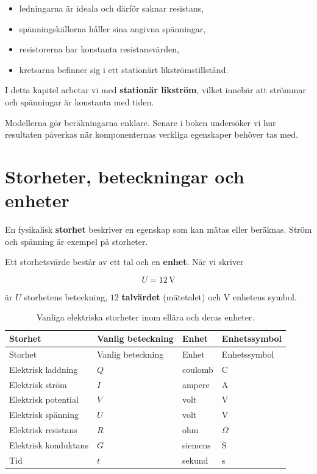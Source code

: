 \documentclass[
  swedish,
  11pt,
  a4paper,
  DIV=11,
  numbers=noendperiod,
  twoside,
  open=any]{scrreprt}
\begin{document}
\begin{itemize}
\item
  ledningarna är ideala och därför saknar resistans,
\item
  spänningskällorna håller sina angivna spänningar,
\item
  resistorerna har konstanta resistansvärden,
\item
  kretsarna befinner sig i ett stationärt likströmstillstånd.
\end{itemize}

I detta kapitel arbetar vi med \textbf{stationär likström}, vilket
innebär att strömmar och spänningar är konstanta med tiden.

Modellerna gör beräkningarna enklare. Senare i boken undersöker vi hur
resultaten påverkas när komponenternas verkliga egenskaper behöver tas
med.

\section{Storheter, beteckningar och
enheter}\label{sec-grunder-storheter-beteckningar-och-enheter}

En fysikalisk \textbf{storhet} beskriver en egenskap som kan mätas eller
beräknas. Ström och spänning är exempel på storheter.

Ett storhetsvärde består av ett tal och en \textbf{enhet}. När vi
skriver

\[
U = 12\,\mathrm{V}
\]

är \(U\) storhetens beteckning, \(12\) \textbf{talvärdet} (mätetalet)
och \(\mathrm{V}\) enhetens symbol.

\begin{longtable}[]{@{}llll@{}}
\caption{Vanliga elektriska storheter inom ellära och deras
enheter.}\label{tbl-storheter}\tabularnewline
\toprule\noalign{}
Storhet & Vanlig beteckning & Enhet & Enhetssymbol \\
\midrule\noalign{}
\endfirsthead
\toprule\noalign{}
Storhet & Vanlig beteckning & Enhet & Enhetssymbol \\
\midrule\noalign{}
\endhead
\bottomrule\noalign{}
\endlastfoot
Elektrisk laddning & \(Q\) & coulomb & \(\mathrm{C}\) \\
Elektrisk ström & \(I\) & ampere & \(\mathrm{A}\) \\
Elektrisk potential & \(V\) & volt & \(\mathrm{V}\) \\
Elektrisk spänning & \(U\) & volt & \(\mathrm{V}\) \\
Elektrisk resistans & \(R\) & ohm & \(\Omega\) \\
Elektrisk konduktans & \(G\) & siemens & \(\mathrm{S}\) \\
Tid & \(t\) & sekund & \(\mathrm{s}\) \\
\end{longtable}
\end{document}
